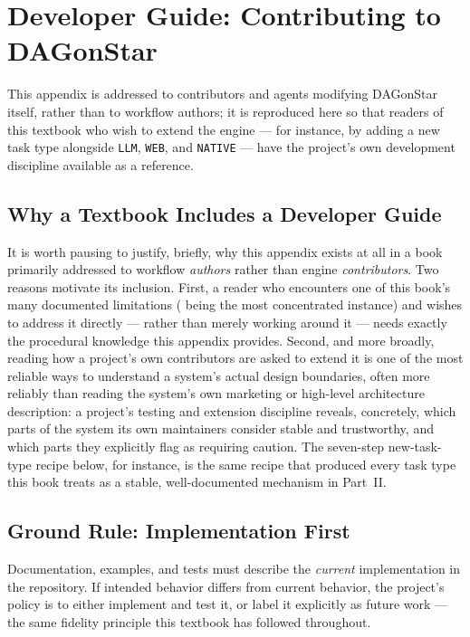 \chapter{Developer Guide: Contributing to DAGonStar}
\label{app:developer}

This appendix is addressed to contributors and agents modifying DAGonStar
itself, rather than to workflow authors; it is reproduced here so that
readers of this textbook who wish to extend the engine --- for instance, by
adding a new task type alongside \texttt{LLM}, \texttt{WEB}, and
\texttt{NATIVE} --- have the project's own development discipline available
as a reference.

\section{Why a Textbook Includes a Developer Guide}

It is worth pausing to justify, briefly, why this appendix exists at all in
a book primarily addressed to workflow \emph{authors} rather than engine
\emph{contributors}. Two reasons motivate its inclusion. First, a reader who
encounters one of this book's many documented limitations
( being the most concentrated instance) and
wishes to address it directly --- rather than merely working around it ---
needs exactly the procedural knowledge this appendix provides. Second, and
more broadly, reading how a project's own contributors are asked to extend
it is one of the most reliable ways to understand a system's actual design
boundaries, often more reliably than reading the system's own marketing or
high-level architecture description: a project's testing and extension
discipline reveals, concretely, which parts of the system its own
maintainers consider stable and trustworthy, and which parts they
explicitly flag as requiring caution. The seven-step new-task-type recipe
below, for instance, is the same recipe that produced every task type this
book treats as a stable, well-documented mechanism in Part~II.

\section{Ground Rule: Implementation First}

Documentation, examples, and tests must describe the \emph{current}
implementation in the repository. If intended behavior differs from current
behavior, the project's policy is to either implement and test it, or label
it explicitly as future work --- the same fidelity principle this textbook
has followed throughout.

